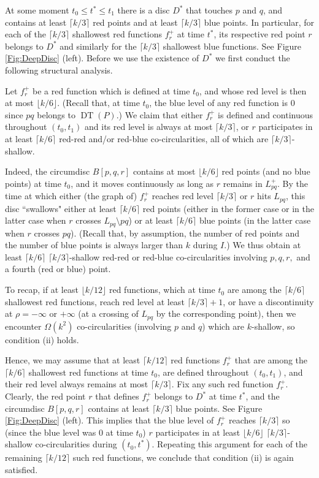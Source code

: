 \documentclass[letter,11pt]{article}
\def \L{{L}}
\def\DT{\mathop{\mathrm{DT}}}
\begin{document}
\smallskip
{} At some moment $t_0\leq t^*\leq t_1$ there is a disc $D^*$ that touches $p$ and $q$, and contains at least $\lceil k/3\rceil$ red points and at least $\lceil k/3\rceil$ blue points.
In particular, for each of the $\lceil k/3\rceil$ shallowest red functions $f_r^+$ at time $t^*$, its respective red point $r$ belongs to $D^*$ and similarly for the $\lceil k/3\rceil$ shallowest blue functions.
See Figure \ref{Fig:DeepDisc} (left). Before we use the existence of $D^*$ we first conduct the following structural analysis.

Let $f_r^+$ be a red function which is defined at time $t_0$, and whose red level is then at most $\lfloor k/6\rfloor$. (Recall that, at time $t_0$, the blue level of any red function is $0$ since $pq$ belongs to $\DT(P)$.) We claim that either $f_r^+$ is defined and continuous throughout $(t_0,t_1)$ and its red level is always at most $\lceil k/3\rceil$, or $r$ participates in at least $\lceil k/6\rceil$ red-red and/or red-blue co-circularities, all of which are $\lceil k/3\rceil$-shallow. 

Indeed, the circumdisc $B[p,q,r]$ contains at most $\lfloor k/6\rfloor$ red points (and no blue points) at time $t_0$, and it moves continuously as long as $r$ remains in $\L_{pq}^+$. By the time at which either (the graph of) $f_r^+$ reaches red level $\lceil k/3\rceil$ or $r$ hits $\L_{pq}$, this disc ``swallows" either at least $\lceil k/6\rceil$ red points (either in the former case or in the latter case when $r$ crosses $\L_{pq}\setminus pq$) or at least $\lceil k/6\rceil$ blue points (in the latter case when $r$ crosses $pq$). (Recall that, by assumption, the number of red points and the number of blue points is always larger than $k$ during $I$.) We thus obtain at least $\lceil k/6\rceil$ $\lceil k/3\rceil$-shallow red-red or red-blue co-circularities involving $p,q,r,$ and a fourth (red or blue) point. 

To recap, if at least $\lfloor k/12\rfloor$ red functions, which at time $t_0$ are among the $\lceil k/6\rceil$ shallowest red functions, reach red level at least $\lceil k/3\rceil+1$, or have a discontinuity at $\rho=-\infty$ or $+\infty$ (at a crossing of $\L_{pq}$ by the corresponding point), then we encounter $\Omega(k^2)$ co-circularities (involving $p$ and $q$) which are $k$-shallow, so condition (ii) holds.

Hence, we may assume that at least $\lceil k/12 \rceil$ red functions $f_r^+$ that are among the $\lceil k/6\rceil$ shallowest red functions at time $t_0$, are defined throughout $(t_0,t_1)$, and their red level always remains at most $\lceil k/3\rceil$.
Fix any such red function $f_r^+$.
Clearly, the red point $r$ that defines $f_r^+$ belongs to $D^*$ at time $t^*$, and the circumdisc $B[p,q,r]$ contains at least $\lceil k/3\rceil$ blue points. See Figure \ref{Fig:DeepDisc} (left).
This implies that the blue level of $f_r^+$ reaches $\lceil k/3\rceil$ so (since the blue level was $0$ at time $t_0$) $r$ participates in at least $\lfloor k/6\rfloor$ $\lceil k/3\rceil$-shallow co-circularities during $(t_0,t^*)$. Repeating this argument for each of the remaining $\lceil k/12\rceil$ such red functions, we conclude that condition (ii) is again satisfied.
\end{document}

